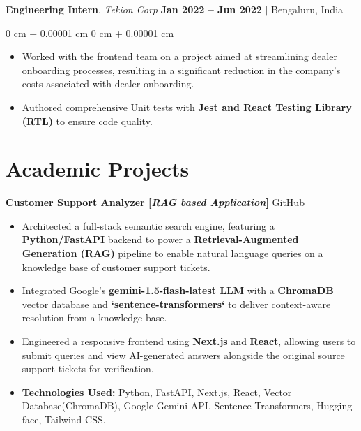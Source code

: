 \documentclass[10pt, letterpaper]{article}
\newenvironment{highlights}{
    \begin{itemize}[
        topsep=0.10 cm,     %
        parsep=0.10 cm,     %
        partopsep=0pt,      %
        itemsep=0pt,        %
        leftmargin=0 cm + 10pt  %
    ]
}{
    \end{itemize}
}
\newenvironment{onecolentry}{
    \begin{adjustwidth}{
        0 cm + 0.00001 cm
    }{
        0 cm + 0.00001 cm
    }
}{
    \end{adjustwidth}
}
\begin{document}
        \vspace{0.3 cm}

        \noindent
        \textbf{Engineering Intern}, {\color{darkgray}\textit{Tekion Corp}} \hfill {\color{darkgray}\small{ \textbf{Jan 2022 – Jun 2022} $|$ Bengaluru, India }}

        \vspace{0.10 cm}
        \begin{onecolentry}
            \begin{highlights}
                \item Worked with the frontend team on a project aimed at streamlining dealer onboarding processes, resulting in a significant reduction in the company's costs associated with dealer onboarding.
                \item Authored comprehensive Unit tests with \textbf{Jest and React Testing Library (RTL)} to ensure code quality.
            \end{highlights}
        \end{onecolentry}


    
    \section{Academic Projects}

        \noindent
        \textbf{Customer Support Analyzer [\textit{RAG based Application}]} \hfill \href{https://github.com/tushar-fs/customer-support-analyzer}{\small \faGithub \space GitHub}
        
        \begin{highlights}
            \item Architected a full-stack semantic search engine, featuring a \textbf{Python/FastAPI} backend to power a \textbf{Retrieval-Augmented Generation (RAG)} pipeline to enable natural language queries on a knowledge base of customer support tickets.
            \item Integrated Google's \textbf{gemini-1.5-flash-latest LLM} with a \textbf{ChromaDB} vector database and \textbf{`sentence-transformers`} to deliver context-aware resolution from a knowledge base.
            \item Engineered a responsive frontend using \textbf{Next.js} and \textbf{React}, allowing users to submit queries and view AI-generated answers alongside the original source support tickets for verification.
            \item \textbf{Technologies Used:} Python, FastAPI, Next.js, React, Vector Database(ChromaDB), Google Gemini API, Sentence-Transformers, Hugging face, Tailwind CSS.
        \end{highlights}
\end{document}

